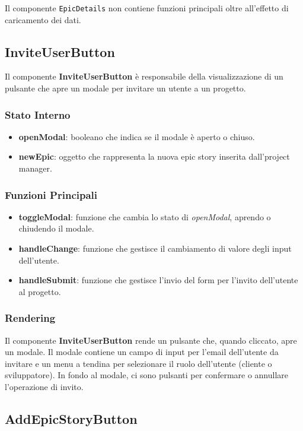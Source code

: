\documentclass{article}
\begin{document}
Il componente \texttt{EpicDetails} non contiene funzioni principali oltre all'effetto di caricamento dei dati.

\subsection*{InviteUserButton}
Il componente \textbf{InviteUserButton} è responsabile della visualizzazione di un pulsante che apre un modale per invitare un utente a un progetto.

\subsubsection*{Stato Interno}
\begin{itemize}
    \item \textbf{openModal}: booleano che indica se il modale è aperto o chiuso.
    \item \textbf{newEpic}: oggetto che rappresenta la nuova epic story inserita dall'project manager.
\end{itemize}

\subsubsection*{Funzioni Principali}
\begin{itemize}
    \item \textbf{toggleModal}: funzione che cambia lo stato di \textit{openModal}, aprendo o chiudendo il modale.
    \item \textbf{handleChange}: funzione che gestisce il cambiamento di valore degli input dell'utente.
    \item \textbf{handleSubmit}: funzione che gestisce l'invio del form per l'invito dell'utente al progetto.
\end{itemize}

\subsubsection*{Rendering}
Il componente \textbf{InviteUserButton} rende un pulsante che, quando cliccato, apre un modale. Il modale contiene un campo di input per l'email dell'utente da invitare e un menu a tendina per selezionare il ruolo dell'utente (cliente o sviluppatore). In fondo al modale, ci sono pulsanti per confermare o annullare l'operazione di invito.

\subsection*{AddEpicStoryButton}
\end{document}

